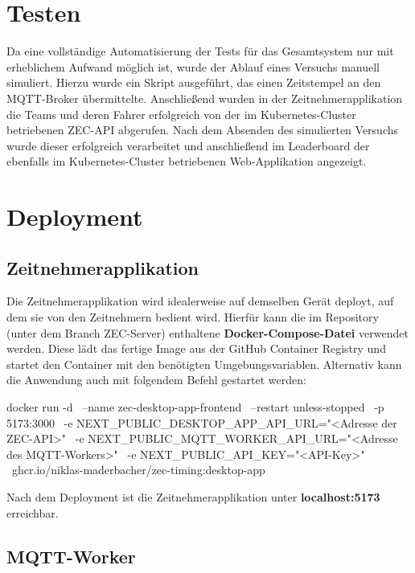 
\section{Testen}

Da eine vollständige Automatisierung der Tests für das Gesamtsystem nur mit erheblichem Aufwand möglich ist, wurde der Ablauf eines Versuchs manuell simuliert. Hierzu wurde ein Skript ausgeführt, das einen Zeitstempel an den MQTT-Broker übermittelte. Anschließend wurden in der Zeitnehmerapplikation die Teams und deren Fahrer erfolgreich von der im Kubernetes-Cluster betriebenen ZEC-API abgerufen. Nach dem Absenden des simulierten Versuchs wurde dieser erfolgreich verarbeitet und anschließend im Leaderboard der ebenfalls im Kubernetes-Cluster betriebenen Web-Applikation angezeigt.

\section{Deployment}

\subsection{Zeitnehmerapplikation}

Die Zeitnehmerapplikation wird idealerweise auf demselben Gerät deployt, auf dem sie von den Zeitnehmern bedient wird. Hierfür kann die im Repository (unter dem Branch ZEC-Server) enthaltene \textbf{Docker-Compose-Datei} verwendet werden. Diese lädt das fertige Image aus der GitHub Container Registry und startet den Container mit den benötigten Umgebungsvariablen. Alternativ kann die Anwendung auch mit folgendem Befehl gestartet werden:

\begin{CodeBox}
docker run -d \
  --name zec-desktop-app-frontend \
  --restart unless-stopped \
  -p 5173:3000 \
  -e NEXT_PUBLIC_DESKTOP_APP_API_URL="<Adresse der ZEC-API>" \
  -e NEXT_PUBLIC_MQTT_WORKER_API_URL="<Adresse des MQTT-Workers>" \
  -e NEXT_PUBLIC_API_KEY="<API-Key>" \
  ghcr.io/niklas-maderbacher/zec-timing:desktop-app
\end{CodeBox}

Nach dem Deployment ist die Zeitnehmerapplikation unter \textbf{localhost:5173} erreichbar.

\subsection{MQTT-Worker}

